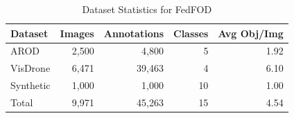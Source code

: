 \begin{table}[t]
\centering
\caption{Dataset Statistics for FedFOD}
\label{tab:dataset_stats}
\begin{tabular}{lrrrr}
\toprule
Dataset & Images & Annotations & Classes & Avg Obj/Img \\
\midrule
AROD & 2,500 & 4,800 & 5 & 1.92 \\
VisDrone & 6,471 & 39,463 & 4 & 6.10 \\
Synthetic & 1,000 & 1,000 & 10 & 1.00 \\
Total & 9,971 & 45,263 & 15 & 4.54 \\
\bottomrule
\end{tabular}
\end{table}